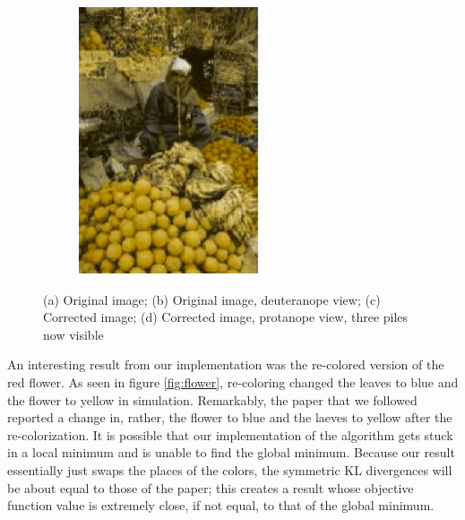 \documentclass[10pt,twocolumn,letterpaper]{article}
\begin{document}
\begin{figure}[h]
\begin{subfigure}{0.23\textwidth}
    \includegraphics[width=\textwidth]{fruits4.png}
    \caption{}
  \end{subfigure}
  \caption{(a) Original image; (b) Original image, deuteranope view; (c) Corrected image; (d) Corrected image, protanope view, three piles now visible}
  \label{fig:fruits}
\end{figure}

An interesting result from our implementation was the re-colored version of the red flower. As seen in figure \ref{fig:flower}, re-coloring changed the leaves to blue and the flower to yellow in simulation. Remarkably, the paper that we followed reported a change in, rather, the flower to blue and the laeves to yellow after the re-colorization. It is possible that our implementation of the algorithm gets stuck in a local minimum and is unable to find the global minimum. Because our result essentially just swaps the places of the colors, the symmetric KL divergences will be about equal to those of the paper; this creates a result whose objective function value is extremely close, if not equal, to that of the global minimum. 
\end{document}

